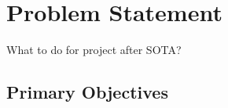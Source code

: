 \chapter{Problem Statement}\label{sec:problem-statement}
What to do for project after SOTA?

\section{Primary Objectives}
